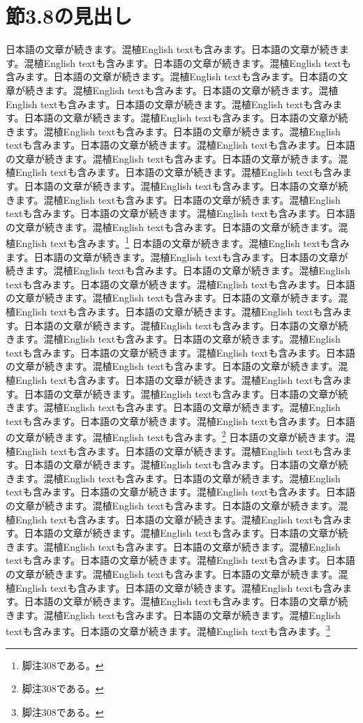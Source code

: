 \documentclass[pdflatex,book]{jlreq}
\begin{document}
\section{節3.8の見出し}
日本語の文章が続きます。混植English textも含みます。日本語の文章が続きます。混植English textも含みます。日本語の文章が続きます。混植English textも含みます。日本語の文章が続きます。混植English textも含みます。日本語の文章が続きます。混植English textも含みます。日本語の文章が続きます。混植English textも含みます。日本語の文章が続きます。混植English textも含みます。日本語の文章が続きます。混植English textも含みます。日本語の文章が続きます。混植English textも含みます。日本語の文章が続きます。混植English textも含みます。日本語の文章が続きます。混植English textも含みます。日本語の文章が続きます。混植English textも含みます。日本語の文章が続きます。混植English textも含みます。日本語の文章が続きます。混植English textも含みます。日本語の文章が続きます。混植English textも含みます。日本語の文章が続きます。混植English textも含みます。日本語の文章が続きます。混植English textも含みます。日本語の文章が続きます。混植English textも含みます。日本語の文章が続きます。混植English textも含みます。日本語の文章が続きます。混植English textも含みます。\footnote{脚注308である。}
日本語の文章が続きます。混植English textも含みます。日本語の文章が続きます。混植English textも含みます。日本語の文章が続きます。混植English textも含みます。日本語の文章が続きます。混植English textも含みます。日本語の文章が続きます。混植English textも含みます。日本語の文章が続きます。混植English textも含みます。日本語の文章が続きます。混植English textも含みます。日本語の文章が続きます。混植English textも含みます。日本語の文章が続きます。混植English textも含みます。日本語の文章が続きます。混植English textも含みます。日本語の文章が続きます。混植English textも含みます。日本語の文章が続きます。混植English textも含みます。日本語の文章が続きます。混植English textも含みます。日本語の文章が続きます。混植English textも含みます。日本語の文章が続きます。混植English textも含みます。日本語の文章が続きます。混植English textも含みます。日本語の文章が続きます。混植English textも含みます。日本語の文章が続きます。混植English textも含みます。日本語の文章が続きます。混植English textも含みます。日本語の文章が続きます。混植English textも含みます。\footnote{脚注308である。}
日本語の文章が続きます。混植English textも含みます。日本語の文章が続きます。混植English textも含みます。日本語の文章が続きます。混植English textも含みます。日本語の文章が続きます。混植English textも含みます。日本語の文章が続きます。混植English textも含みます。日本語の文章が続きます。混植English textも含みます。日本語の文章が続きます。混植English textも含みます。日本語の文章が続きます。混植English textも含みます。日本語の文章が続きます。混植English textも含みます。日本語の文章が続きます。混植English textも含みます。日本語の文章が続きます。混植English textも含みます。日本語の文章が続きます。混植English textも含みます。日本語の文章が続きます。混植English textも含みます。日本語の文章が続きます。混植English textも含みます。日本語の文章が続きます。混植English textも含みます。日本語の文章が続きます。混植English textも含みます。日本語の文章が続きます。混植English textも含みます。日本語の文章が続きます。混植English textも含みます。日本語の文章が続きます。混植English textも含みます。日本語の文章が続きます。混植English textも含みます。\footnote{脚注308である。}
\end{document}
